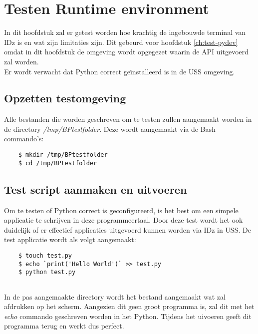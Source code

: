 \chapter{Testen Runtime environment}
\label{ch:test-runtime}
In dit hoofdstuk zal er getest worden hoe krachtig de ingebouwde terminal van IDz is en wat zijn limitaties zijn. Dit gebeurd voor hoofdstuk \ref{ch:test-pydev} omdat in dit hoofdstuk de omgeving wordt opgegezet waarin de API uitgevoerd zal worden. \\
Er wordt verwacht dat Python correct geïnstalleerd is in de USS omgeving.

\section{Opzetten testomgeving}
Alle bestanden die worden geschreven om te testen zullen aangemaakt worden in de directory \textit{/tmp/BPtestfolder}. 
Deze wordt aangemaakt via de Bash commando's: 

\begin{lstlisting}
    $ mkdir /tmp/BPtestfolder
    $ cd /tmp/BPtestfolder
\end{lstlisting}

\section{Test script aanmaken en uitvoeren}
Om te testen of Python correct is geconfigureerd, is het best om een simpele applicatie te schrijven in deze programmeertaal. Door deze test wordt het ook duidelijk of er effectief applicaties uitgevoerd kunnen worden via IDz in USS. De test applicatie wordt als volgt aangemaakt:


\begin{lstlisting}
    $ touch test.py
    $ echo `print('Hello World')` >> test.py
    $ python test.py
    
\end{lstlisting}

In de pas aangemaakte directory wordt het bestand  aangemaakt wat  zal afdrukken op het scherm. Aangezien dit geen groot programma is, zal dit met het \textit{echo} commando geschreven worden in het Python. Tijdens het uivoeren geeft dit programma  terug en werkt dus perfect.

